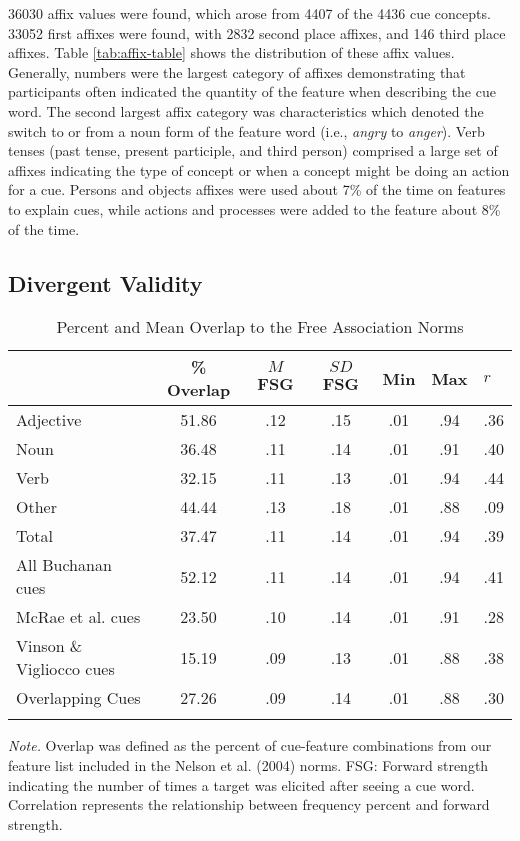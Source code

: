 \documentclass[english,,man]{apa6}
\theoremstyle{definition}
\theoremstyle{definition}
\theoremstyle{definition}
\theoremstyle{remark}
\begin{document}
36030 affix values were found, which arose from 4407 of the 4436 cue
concepts. 33052 first affixes were found, with 2832 second place
affixes, and 146 third place affixes. Table \ref{tab:affix-table} shows
the distribution of these affix values. Generally, numbers were the
largest category of affixes demonstrating that participants often
indicated the quantity of the feature when describing the cue word. The
second largest affix category was characteristics which denoted the
switch to or from a noun form of the feature word (i.e., \emph{angry} to
\emph{anger}). Verb tenses (past tense, present participle, and third
person) comprised a large set of affixes indicating the type of concept
or when a concept might be doing an action for a cue. Persons and
objects affixes were used about 7\% of the time on features to explain
cues, while actions and processes were added to the feature about 8\% of
the time.

\hypertarget{divergent-validity}{%
\subsection{Divergent Validity}\label{divergent-validity}}

\begin{table}[tbp]
\begin{center}
\begin{threeparttable}
\caption{\label{tab:divergent-table}Percent and Mean Overlap to the Free Association Norms}
\begin{tabular}{lcccccl}
\toprule
  & \% Overlap & $M$ FSG & $SD$ FSG & Min & Max & $r$\\
\midrule
Adjective & 51.86 & .12 & .15 & .01 & .94 & .36\\
Noun & 36.48 & .11 & .14 & .01 & .91 & .40\\
Verb & 32.15 & .11 & .13 & .01 & .94 & .44\\
Other & 44.44 & .13 & .18 & .01 & .88 & .09\\
Total & 37.47 & .11 & .14 & .01 & .94 & .39\\
All Buchanan cues & 52.12 & .11 & .14 & .01 & .94 & .41\\
McRae et al. cues & 23.50 & .10 & .14 & .01 & .91 & .28\\
Vinson \& Vigliocco cues & 15.19 & .09 & .13 & .01 & .88 & .38\\
Overlapping Cues & 27.26 & .09 & .14 & .01 & .88 & .30\\
\bottomrule
\addlinespace
\end{tabular}
\begin{tablenotes}[para]
\normalsize{\textit{Note.} Overlap was defined as the percent of cue-feature combinations from our feature list included in the Nelson et al. (2004) norms. FSG: Forward strength indicating the number of times a target was elicited after seeing a cue word. Correlation represents the relationship between frequency percent and forward strength.}
\end{tablenotes}
\end{threeparttable}
\end{center}
\end{table}
\end{document}
